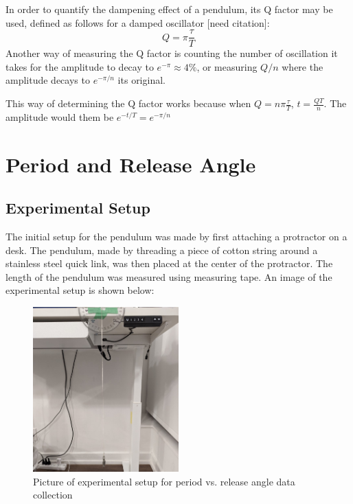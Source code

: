 \documentclass[12pt]{article}
\begin{document}
In order to quantify the dampening effect of a pendulum, its Q factor may be used, defined as follows for a damped oscillator [need citation]:
\begin{equation}
    Q = \pi\frac{\tau}{T}
\end{equation}
Another way of measuring the Q factor is counting the number of oscillation it takes for the amplitude to decay to $e^{-\pi} \approx 4\%$, or measuring $Q/n$ where the amplitude decays to $e^{-{\pi/n}}$ its original.

This way of determining the Q factor works because when $Q = n\pi\frac{\tau}{T}$, $t = \frac{QT}{n}$. The amplitude would them be $e^{-{t/T}} = e^{-{\pi/n}}$

\section{Period and Release Angle}

\subsection{Experimental Setup}
The initial setup for the pendulum was made by first attaching a protractor on a desk. The pendulum, made by threading a piece of cotton string around a stainless steel quick link, was then placed at the center of the protractor. The length of the pendulum was measured using measuring tape. An image of the experimental setup is shown below:

\begin{figure}[!hptb]
    \centering
    \includegraphics[width=0.5\textwidth]{../figures/exp_setup1.jpg}
    \caption{\centering Picture of experimental setup for period vs. release angle data collection}
    \label{fig:figure 1}
\end{figure}
\end{document}

